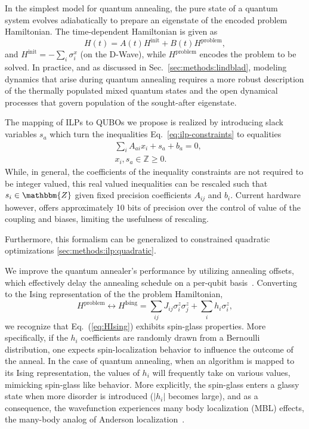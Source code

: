 \documentclass[10pt]{iopart}
\begin{document}
In the simplest model for quantum annealing, the pure state of a quantum system evolves adiabatically to prepare an eigenstate of the encoded problem Hamiltonian. The time-dependent Hamiltonian is given as
\begin{equation}
 H(t) = A(t) H^{\textrm{init}} + B(t) H^{\textrm{problem}}, \label{eq:tdhamiltonian}
\end{equation}
and $H^\textrm{init}=-\sum_i\sigma^x_i$ (on the D-Wave), while $H^\textrm{problem}$ encodes the problem to be solved. In practice, and as discussed in Sec.~\ref{sec:methods:lindblad}, modeling dynamics that arise during quantum annealing requires a more robust description of the thermally populated mixed quantum states and the open dynamical processes that govern population of the sought-after eigenstate.

The mapping of ILPs to QUBOs we propose is realized by introducing slack variables $s_a$ which turn the inequalities Eq.~\eqref{eq:ilp-constraints} to equalities
\begin{align}
  \label{eq:ilp:slack}
  & \sum_i A_{a i}x_i + s_a + b_a = 0, \\
  & x_i, s_a \in \mathbb{Z} \geq 0.
\end{align}
While, in general, the coefficients of the inequality constraints are not required to be integer valued, this real valued inequalities can be rescaled such that $s_i \in \mathbbm{Z}$ given fixed precision coefficients $A_{ij}$ and $b_i$. Current hardware however, offers approximately 10 bits of precision over the control of value of the coupling and biases, limiting the usefulness of rescaling.

Furthermore, this formalism can be generalized to constrained quadratic optimizations \ref{sec:methods:ilp:quadratic}.

We improve the quantum annealer's performance by utilizing annealing offsets, which effectively delay the annealing schedule on a per-qubit basis~\cite{PhysRevA.96.042322,hsu2018quantum,10.1007/978-3-030-14082-3_14,2020RPPh...83e4401H}.
Converting to the Ising representation of the the problem Hamiltonian,
\begin{equation}
    \label{eq:HIsing}
     H^{\textrm{problem}} \leftrightarrow H^{\textrm{Ising}} = \sum_{ij} J_{ij} \sigma^z_i \sigma^z_j + \sum_i h_i \sigma^z_i ,
\end{equation}
we recognize that Eq.~(\ref{eq:HIsing}) exhibits spin-glass properties. More specifically, if the $h_i$ coefficients are randomly drawn from a Bernoulli distribution, one expects spin-localization behavior to influence the outcome of the anneal.
In the case of quantum annealing, when an algorithm is mapped to its Ising representation, the values of $h_i$ will frequently take on various values, mimicking spin-glass like behavior.
More explicitly, the spin-glass enters a glassy state when more disorder is introduced ($|h_i|$ becomes large), and as a consequence, the wavefunction experiences many body localization (MBL) effects, the many-body analog of Anderson localization~\cite{doi:10.1146/annurev-conmatphys-031214-014726,PhysRevE.90.022103,RevModPhys.91.021001,ALET2018498,PhysRevB.82.174411,PhysRevLett.109.017202}.
\end{document}
